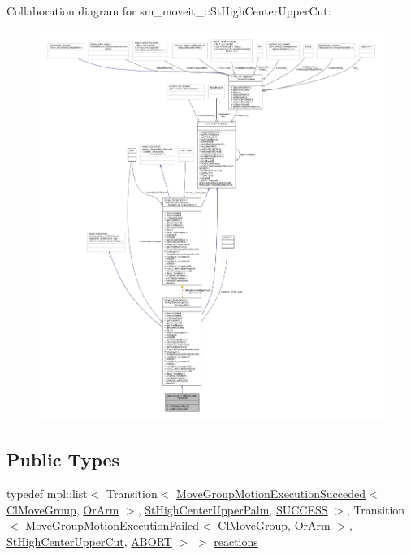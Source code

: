 Collaboration diagram for sm\+\_\+moveit\+\_\+:\+:St\+High\+Center\+Upper\+Cut\+:
\nopagebreak
\begin{figure}[H]
\begin{center}
\leavevmode
\includegraphics[width=350pt]{structsm__moveit__3_1_1StHighCenterUpperCut__coll__graph}
\end{center}
\end{figure}
\subsection*{Public Types}
\begin{DoxyCompactItemize}
\item 
typedef mpl\+::list$<$ Transition$<$ \hyperlink{structmove__group__interface__client_1_1MoveGroupMotionExecutionSucceded}{Move\+Group\+Motion\+Execution\+Succeded}$<$ \hyperlink{classmove__group__interface__client_1_1ClMoveGroup}{Cl\+Move\+Group}, \hyperlink{classsm__moveit__3_1_1OrArm}{Or\+Arm} $>$, \hyperlink{structsm__moveit__3_1_1StHighCenterUpperPalm}{St\+High\+Center\+Upper\+Palm}, \hyperlink{classSUCCESS}{S\+U\+C\+C\+E\+SS} $>$, Transition$<$ \hyperlink{structmove__group__interface__client_1_1MoveGroupMotionExecutionFailed}{Move\+Group\+Motion\+Execution\+Failed}$<$ \hyperlink{classmove__group__interface__client_1_1ClMoveGroup}{Cl\+Move\+Group}, \hyperlink{classsm__moveit__3_1_1OrArm}{Or\+Arm} $>$, \hyperlink{structsm__moveit__3_1_1StHighCenterUpperCut}{St\+High\+Center\+Upper\+Cut}, \hyperlink{classABORT}{A\+B\+O\+RT} $>$ $>$ \hyperlink{structsm__moveit__3_1_1StHighCenterUpperCut_a91b32fdc7c44562edaaf5ff024e95505}{reactions}
\end{DoxyCompactItemize}
